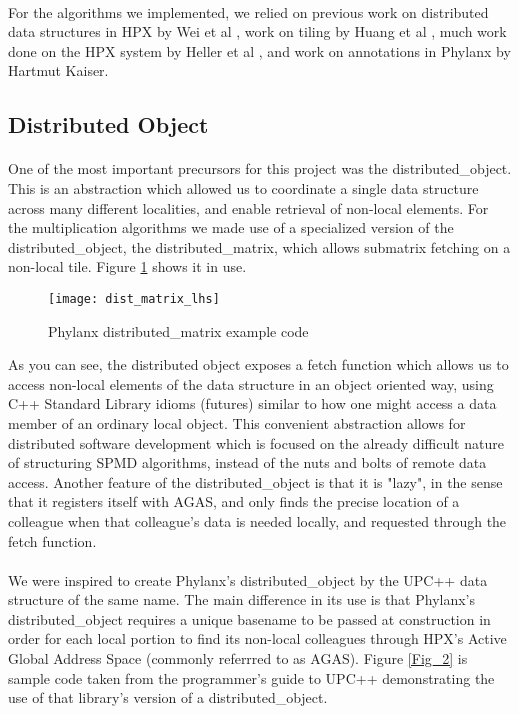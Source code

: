 \paragraph{}
For the algorithms we implemented, we relied on previous work on distributed data structures in HPX by Wei et al \cite{WeiDistObj}, work on tiling by Huang et al \cite{Spartan}, much work done on the HPX system by Heller et al \cite{Heller2017}, and work on annotations in Phylanx by Hartmut Kaiser.
\subsection{Distributed Object}

\paragraph{}
One of the most important precursors for this project was the distributed\_object. This is an abstraction which allowed us to coordinate a single data structure across many different localities, and enable retrieval of non-local elements. For the multiplication algorithms we made use of a specialized version of the distributed\_object, the distributed\_matrix, which allows submatrix fetching on a non-local tile. Figure \ref{Fig_1} shows it in use.


\begin{figure}
	\centering
	\texttt{[image: dist\_matrix\_lhs]}
	\caption{Phylanx distributed\_matrix example code}
	\label{Fig_1}
\end{figure}


As you can see, the distributed object exposes a fetch function which allows us to access non-local elements of the data structure in an object oriented way, using C++ Standard Library idioms (futures) similar to how one might access a data member of an ordinary local object. This convenient abstraction allows for distributed software development which is focused on the already difficult nature of structuring SPMD algorithms, instead of the nuts and bolts of remote data access. Another feature of the distributed\_object is that it is "lazy", in the sense that it registers itself with AGAS, and only finds the precise location of a colleague when that colleague's data is needed locally, and requested through the fetch function.
\paragraph{}
We were inspired to create Phylanx's distributed\_object by the UPC++ \cite{UPCXX} data structure of the same name. The main difference in its use is that Phylanx's distributed\_object requires a unique basename to be passed at construction in order for each local portion to find its non-local colleagues through HPX's Active Global Address Space (commonly referrred to as AGAS). Figure \ref{Fig_2} is sample code taken from the programmer's guide to UPC++  demonstrating the use of that library's version of a distributed\_object. 

